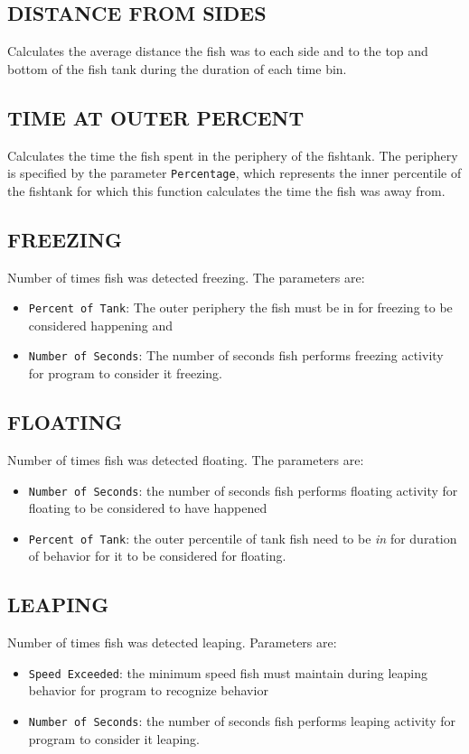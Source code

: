 \documentclass[12pt,titlepage]{report}
\begin{document}
\subsection{DISTANCE FROM SIDES}
Calculates the average distance the fish was to each side and to the top and bottom of the fish tank during the duration of each time bin.
\subsection{TIME AT OUTER PERCENT}
Calculates the time the fish spent in the periphery of the fishtank. The periphery is specified by the parameter \texttt{Percentage}, which represents the inner percentile of the fishtank for which this function calculates the time the fish was away from.
\subsection{FREEZING}
Number of times fish was detected freezing. The parameters are: 
\begin{itemize}
\item \texttt{Percent of Tank}: The outer periphery the fish must be in for freezing to be considered happening and \item \texttt{Number of Seconds}: The number of seconds fish performs freezing activity for program to consider it freezing.
\end{itemize}
\subsection{FLOATING}
Number of times fish was detected floating. The parameters are: 
\begin{itemize}
\item \texttt{Number of Seconds}: the number of seconds fish performs floating activity for floating to be considered to have happened 
\item \texttt{Percent of Tank}: the outer percentile of tank fish need to be \emph{in} for duration of behavior for it to be considered for floating.                                                      
\end{itemize}
\subsection{LEAPING}
Number of times fish was detected leaping. Parameters are: 
\begin{itemize}
\item \texttt{Speed Exceeded}: the minimum speed fish must maintain during leaping behavior for program to recognize behavior
\item \texttt{Number of Seconds}: the number of seconds fish performs leaping activity for program to consider it leaping.
\end{itemize}
\end{document}
